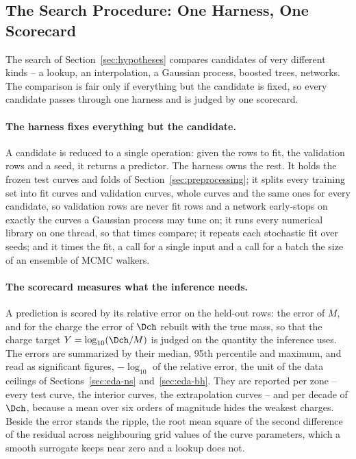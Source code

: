 \subsection{The Search Procedure: One Harness, One Scorecard}
\label{sec:optimization}

The search of Section~\ref{sec:hypotheses} compares candidates of very different kinds -- a lookup, an interpolation, a Gaussian process, boosted trees, networks. The comparison is fair only if everything but the candidate is fixed, so every candidate passes through one harness and is judged by one scorecard.

\paragraph{The harness fixes everything but the candidate.}
A candidate is reduced to a single operation: given the rows to fit, the validation rows and a seed, it returns a predictor. The harness owns the rest. It holds the frozen test curves and folds of Section~\ref{sec:preprocessing}; it splits every training set into fit curves and validation curves, whole curves and the same ones for every candidate, so validation rows are never fit rows and a network early-stops on exactly the curves a Gaussian process may tune on; it runs every numerical library on one thread, so that times compare; it repeats each stochastic fit over seeds; and it times the fit, a call for a single input and a call for a batch the size of an ensemble of MCMC walkers.

\paragraph{The scorecard measures what the inference needs.}
A prediction is scored by its relative error on the held-out rows: the error of $M$, and for the charge the error of $\Dch$ rebuilt with the true mass, so that the charge target $Y = \log_{10}(\Dch/M)$ is judged on the quantity the inference uses. The errors are summarized by their median, 95th percentile and maximum, and read as significant figures, $-\log_{10}$ of the relative error, the unit of the data ceilings of Sections~\ref{sec:eda-ns} and~\ref{sec:eda-bh}. They are reported per zone -- every test curve, the interior curves, the extrapolation curves -- and per decade of $\Dch$, because a mean over six orders of magnitude hides the weakest charges. Beside the error stands the ripple, the root mean square of the second difference of the residual across neighbouring grid values of the curve parameters, which a smooth surrogate keeps near zero and a lookup does not.

